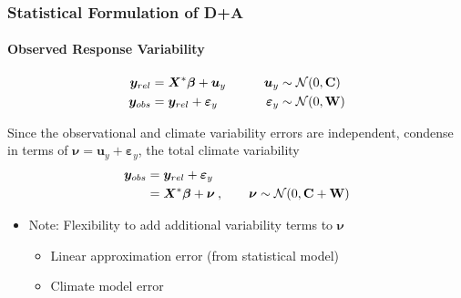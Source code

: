 \documentclass{beamer}
\newcommand{\C}{\ensuremath{\text{Cov}}}
\def\*#1{\bm{#1}}
\def\C{\textbf{\text{C}}}
\def\W{\textbf{\text{W}}}
\begin{document}
\begin{frame}
\frametitle{Statistical Formulation of D+A}
\framesubtitle{Observed Response Variability}

\begin{exampleblock}{}
\vspace*{-\baselineskip}\setlength\belowdisplayshortskip{0pt}
\begin{alignat*}{3}
\*y_{rel} &= \*X^* \*\beta + \*u_y \nonumber  \qquad  &\*u_y &\sim \mathcal N(0,\C) \\
\*y_{obs} &= \*y_{rel} + \*\varepsilon_y &\*\varepsilon_y &\sim \mathcal N(0,\W)
\end{alignat*}
\end{exampleblock}

 Since the observational and climate variability errors are independent, condense in terms of $\*\nu = \*u_y + \*\varepsilon_y$, the total climate variability
\begin{align*}
\*y_{obs} &= \*y_{rel} + \*\varepsilon_y \\
&= \*X^* \* \beta + \*\nu \: , \qquad \* \nu \sim \mathcal{N}(0,\C + \W)
\end{align*}

\begin{itemize}
\item [] \alert{Note:} Flexibility to add additional variability terms to $\*\nu$
\begin{itemize}
\item Linear approximation error (from statistical model)
\item Climate model error
\end{itemize}
\end{itemize}
\end{frame}
\end{document}
